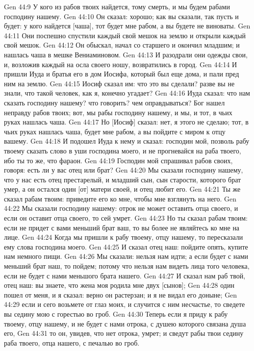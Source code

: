 Gen 44:9  У кого из рабов твоих найдется, тому смерть, и мы будем рабами господину нашему.
Gen 44:10  Он сказал: хорошо; как вы сказали, так пусть и будет: у кого найдется [чаша], тот будет мне рабом, а вы будете не виноваты.
Gen 44:11  Они поспешно спустили каждый свой мешок на землю и открыли каждый свой мешок.
Gen 44:12  Он обыскал, начал со старшего и окончил младшим; и нашлась чаша в мешке Вениаминовом.
Gen 44:13  И разодрали они одежды свои, и, возложив каждый на осла своего ношу, возвратились в город.
Gen 44:14  И пришли Иуда и братья его в дом Иосифа, который был еще дома, и пали пред ним на землю.
Gen 44:15  Иосиф сказал им: что это вы сделали? разве вы не знали, что такой человек, как я, конечно угадает?
Gen 44:16  Иуда сказал: что нам сказать господину нашему? что говорить? чем оправдываться? Бог нашел неправду рабов твоих; вот, мы рабы господину нашему, и мы, и тот, в чьих руках нашлась чаша.
Gen 44:17  Но [Иосиф] сказал: нет, я этого не сделаю; тот, в чьих руках нашлась чаша, будет мне рабом, а вы пойдите с миром к отцу вашему.
Gen 44:18  И подошел Иуда к нему и сказал: господин мой, позволь рабу твоему сказать слово в уши господина моего, и не прогневайся на раба твоего, ибо ты то же, что фараон.
Gen 44:19  Господин мой спрашивал рабов своих, говоря: есть ли у вас отец или брат?
Gen 44:20  Мы сказали господину нашему, что у нас есть отец престарелый, и младший сын, сын старости, которого брат умер, а он остался один [от] матери своей, и отец любит его.
Gen 44:21  Ты же сказал рабам твоим: приведите его ко мне, чтобы мне взглянуть на него.
Gen 44:22  Мы сказали господину нашему: отрок не может оставить отца своего, и если он оставит отца своего, то сей умрет.
Gen 44:23  Но ты сказал рабам твоим: если не придет с вами меньший брат ваш, то вы более не являйтесь ко мне на лице.
Gen 44:24  Когда мы пришли к рабу твоему, отцу нашему, то пересказали ему слова господина моего.
Gen 44:25  И сказал отец наш: пойдите опять, купите нам немного пищи.
Gen 44:26  Мы сказали: нельзя нам идти; а если будет с нами меньший брат наш, то пойдем; потому что нельзя нам видеть лица того человека, если не будет с нами меньшого брата нашего.
Gen 44:27  И сказал нам раб твой, отец наш: вы знаете, что жена моя родила мне двух [сынов];
Gen 44:28  один пошел от меня, и я сказал: верно он растерзан; и я не видал его доныне;
Gen 44:29  если и сего возьмете от глаз моих, и случится с ним несчастье, то сведете вы седину мою с горестью во гроб.
Gen 44:30  Теперь если я приду к рабу твоему, отцу нашему, и не будет с нами отрока, с душею которого связана душа его,
Gen 44:31  то он, увидев, что нет отрока, умрет; и сведут рабы твои седину раба твоего, отца нашего, с печалью во гроб.
